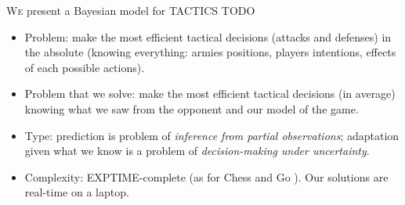 



\lettrine{W}{e} present a Bayesian model for TACTICS TODO

\chaptertoc

\begin{itemize}
\item Problem: make the most efficient tactical decisions (attacks and defenses) in the absolute (knowing everything: armies positions, players intentions, effects of each possible actions).
\item Problem that we solve: make the most efficient tactical decisions (in average) knowing what we saw from the opponent and our model of the game. 
\item Type: prediction is problem of \textit{inference from partial observations}; adaptation given what we know is a problem of \textit{decision-making under uncertainty}.
\item Complexity: EXPTIME-complete (as for Chess and Go \citep{Robson83}). Our solutions are real-time on a laptop.
\end{itemize}


